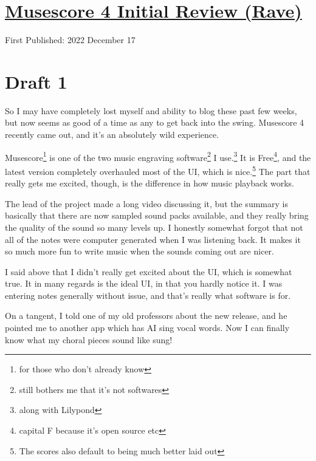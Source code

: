 \documentclass[12pt]{article}[titlepage]
\newcommand{\1}{\={a}}
\newcommand{\2}{\={e}}
\newcommand{\3}{\={\i}}
\newcommand{\4}{\=o}
\newcommand{\5}{\=u}
\newcommand{\6}{\={A}}
\renewcommand{\,}{\textsuperscript{,}}
\begin{document}
\doublespacing
\section{\href{musescore-4.html}{Musescore 4 Initial Review (Rave)}}
First Published: 2022 December 17

\section{Draft 1}
So I may have completely lost myself and ability to blog these past few weeks, but now seems as good of a time as any to get back into the swing.
Musescore 4 recently came out, and it's an absolutely wild experience.

Musescore\footnote{for those who don't already know} is one of the two music engraving software\footnote{still bothers me that it's not softwares} I use.\footnote{along with Lilypond}
It is Free\footnote{capital F because it's open source etc}, and the latest version completely overhauled most of the UI, which is nice.\footnote{The scores also default to being much better laid out}
The part that really gets me excited, though, is the difference in how music playback works.

The lead of the project made a long video discussing it, but the summary is basically that there are now sampled sound packs available, and they really bring the quality of the sound so many levels up.
I honestly somewhat forgot that not all of the notes were computer generated when I was listening back.
It makes it so much more fun to write music when the sounds coming out are nicer.

I said above that I didn't really get excited about the UI, which is somewhat true.
It in many regards is the ideal UI, in that you hardly notice it.
I was entering notes generally without issue, and that's really what software is for.

On a tangent, I told one of my old professors about the new release, and he pointed me to another app which has AI sing vocal words.
Now I can finally know what my choral pieces sound like sung!
\end{document}
